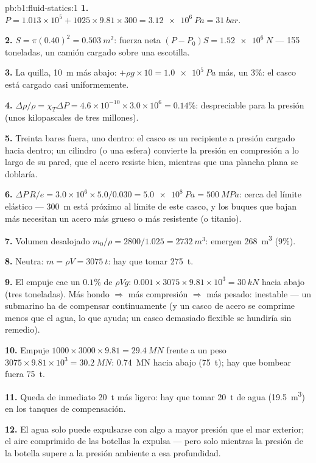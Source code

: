 \begin{solution}{pb:b1:fluid-statics:1}
\textbf{1.} $P = 1.013\times10^5 + 1025 \times 9.81 \times 300 = \qty{3.12e6}{Pa}
= \qty{31}{bar}$.

\textbf{2.} $S = \pi(0.40)^2 = \qty{0.503}{m^2}$: fuerza neta $(P - P_0)S =
\qty{1.52e6}{N}$ --- 155 toneladas, un camión cargado sobre una escotilla.

\textbf{3.} La quilla, \qty{10}{m} más abajo: $+\rho g \times 10 = \qty{1.0e5}{Pa}$ más,
un $3\%$: el casco está cargado casi uniformemente.

\textbf{4.} $\Delta\rho/\rho = \chi_T\Delta P = 4.6\times10^{-10} \times 3.0\times10^6
= 0.14\%$: despreciable para la presión (unos kilopascales de tres
millones).

\textbf{5.} Treinta bares fuera, uno dentro: el casco es un recipiente a
presión cargado hacia dentro; un cilindro (o una esfera) convierte la
presión en compresión a lo largo de su pared, que el acero resiste bien,
mientras que una plancha plana se doblaría.

\textbf{6.} $\Delta P\,R/e = 3.0\times10^6 \times 5.0/0.030 = \qty{5.0e8}{Pa}
= \qty{500}{MPa}$: cerca del límite elástico --- \qty{300}{m} está próximo al
límite de este casco, y los buques que bajan más necesitan un acero más
grueso o más resistente (o titanio).

\textbf{7.} Volumen desalojado $m_0/\rho = 2800/1.025 = \qty{2732}{m^3}$: emergen \qty{268}{m^3}
($9\%$).

\textbf{8.} Neutra: $m = \rho V = \qty{3075}{t}$: hay que tomar \qty{275}{t}.

\textbf{9.} El empuje cae un $0.1\%$ de $\rho Vg$: $0.001 \times 3075 \times 9.81
\times10^3 = \qty{30}{kN}$ hacia abajo (tres toneladas). Más hondo $\Rightarrow$ más
compresión $\Rightarrow$ más pesado: inestable --- un submarino ha de
compensar continuamente (y un casco de acero se comprime menos que el agua,
lo que ayuda; un casco demasiado flexible se hundiría sin remedio).

\textbf{10.} Empuje $1000 \times 3000 \times 9.81 = \qty{29.4}{MN}$ frente a un
peso $3075 \times 9.81 \times 10^3 = \qty{30.2}{MN}$: \qty{0.74}{MN} hacia abajo
(\qty{75}{t}); hay que bombear fuera \qty{75}{t}.

\textbf{11.} Queda de inmediato \qty{20}{t} más ligero: hay que tomar \qty{20}{t} de agua
(\qty{19.5}{m^3}) en los tanques de compensación.

\textbf{12.} El agua solo puede expulsarse con algo a mayor presión que el
mar exterior; el aire comprimido de las botellas la expulsa --- pero solo
mientras la presión de la botella supere a la presión ambiente a esa
profundidad.


\end{solution}
